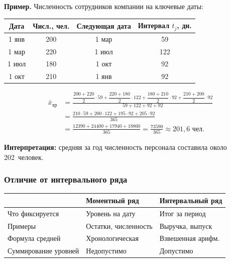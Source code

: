 \documentclass[a4paper]{article}
\begin{document}
	\textbf{Пример.} Численность сотрудников компании на ключевые даты:
	
	\begin{center}
		\renewcommand{\arraystretch}{1.3}
		\begin{tabular}{cccc}
			\toprule
			Дата & Числ., чел. & Следующая дата & Интервал $t_j$, дн. \\
			\midrule
			1 янв  & 200 & 1 мар  & 59 \\
			1 мар  & 220 & 1 июл  & 122 \\
			1 июл  & 180 & 1 окт  & 92 \\
			1 окт  & 210 & 1 янв  & 92 \\
			\bottomrule
		\end{tabular}
	\end{center}
	
	\begin{align*}
		\bar{x}_{\text{хр}} &=
		\frac{\dfrac{200+220}{2}\cdot59
			+ \dfrac{220+180}{2}\cdot122
			+ \dfrac{180+210}{2}\cdot92
			+ \dfrac{210+200}{2}\cdot92}
		{59 + 122 + 92 + 92} \\[8pt]
		&= \frac{210\cdot59 + 200\cdot122 + 195\cdot92 + 205\cdot92}{365} \\[4pt]
		&= \frac{12390 + 24400 + 17940 + 18860}{365}
		= \frac{73590}{365} \approx 201{,}6 \text{ чел.}
	\end{align*}
	
	\textbf{Интерпретация:} средняя за год численность персонала составила около
	202~человек.


\subsubsection{Отличие от интервального ряда}

\begin{center}
	\renewcommand{\arraystretch}{1.4}
	\begin{tabular}{p{3.8cm} p{4.5cm} p{4.5cm}}
		\toprule
		& \textbf{Моментный ряд} & \textbf{Интервальный ряд} \\
		\midrule
		Что фиксируется & Уровень на дату & Итог за период \\
		Примеры & Остатки, численность & Выручка, выпуск \\
		Формула средней & Хронологическая & Взвешенная арифм. \\
		Суммирование уровней & Недопустимо & Допустимо \\
		\bottomrule
	\end{tabular}
\end{center}
\end{document}
